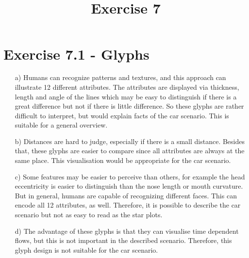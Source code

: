 \documentclass[a4paper]{article}
\date{}
\author{}
\title{Exercise 7}
\begin{document}
\maketitle 
\thispagestyle{fancy}


\section*{Exercise 7.1 - Glyphs}
\begin{enumerate}
	\item[a)]
		Humans can recognize patterns and textures, and this approach can illustrate 12 different attributes. 
		The attributes are displayed via thickness, length and angle of the lines which may be easy to distinguish if there is a great difference but not if there is little difference. 
		So these glyphs are rather difficult to interpret, but would explain facts of the car scenario.
		This is suitable for a general overview.  
	\item [b)]
		Distances are hard to judge, especially if there is a small distance. 
		Besides that, these glyphs are easier to compare since all attributes are always at the same place.
		This visualisation would be appropriate for the car scenario. 	
	\item[c)]
		Some features may be easier to perceive than others, for example the head eccentricity is easier to distinguish than the nose length or mouth curvature. 
		But in general, humans are capable of recognizing different faces. 
		This can encode all 12 attributes, as well. 
		Therefore, it is possible to describe the car scenario but not as easy to read as the star plots. 
	\item[d)]
		The advantage of these glyphs is that they can visualise time dependent flows, but this is not important in the described scenario. 
		Therefore, this glyph design is not suitable for the car scenario. 
\end{enumerate}

\newpage
\end{document}
